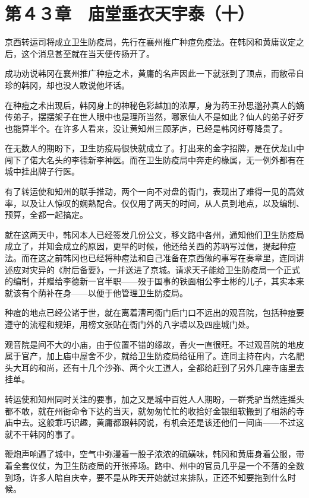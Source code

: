 \section{第４３章　庙堂垂衣天宇泰（十）}

京西转运司将成立卫生防疫局，先行在襄州推广种痘免疫法。在韩冈和黄庸议定之后，这个消息甚至就在当天便传扬开了。

成功劝说韩冈在襄州推广种痘之术，黄庸的名声因此一下就涨到了顶点，而敝帚自珍的韩冈，却也没人敢说他坏话。

在种痘之术出现后，韩冈身上的神秘色彩越加的浓厚，身为药王孙思邈孙真人的嫡传弟子，摆摆架子在世人眼中也是理所当然，哪家仙人不是如此？仙人的弟子好歹也能算半个。在许多人看来，没让黄知州三顾茅庐，已经是韩冈纡尊降贵了。

在无数人的期盼下，卫生防疫局很快就成立了。打出来的金字招牌，是在伏龙山中闯下了偌大名头的李德新李神医。而在卫生防疫局中奔走的椽属，无一例外都有在城中挂出牌子行医。

有了转运使和知州的联手推动，两个一向不对盘的衙门，表现出了难得一见的高效率，以及让人惊叹的娴熟配合。仅仅用了两天的时间，从人员到地点，以及编制、预算，全都一起搞定。

就在这两天中，韩冈本人已经签发几份公文，移文路中各州，通知他们卫生防疫局成立了，并知会成立的原因，更早的时候，他还给关西的苏昞写过信，提起种痘法。而在这之前韩冈也已经将种痘法和自己准备在京西做的事写在奏章里，连同讲述应对灾异的《肘后备要》，一并送进了京城。请求天子能给卫生防疫局一个正式的编制，并赠给李德新一官半职——殁于国事的铁面相公李士彬的儿子，其实本来就该有个荫补在身——以便于他管理卫生防疫局。

种痘的地点已经公诸于世，就在离着漕司衙门后门口不远出的观音院，包括种痘要遵守的流程和规矩，用榜文张贴在衙门外的八字墙以及四座城门处。

观音院是间不大的小庙，由于位置不错的缘故，香火一直很旺。不过观音院的地皮属于官产，加上庙中屋舍不少，就给卫生防疫局给征用了。连同主持在内，六名肥头大耳的和尚，还有十几个沙弥、两个火工道人，全都给赶到了另外几座寺庙里去挂单。

转运使和知州同时关注的要事，加之又是城中百姓人人期盼，一群秃驴当然连摇头都不敢，就在州衙命令下达的当天，就匆匆忙忙的收拾好金银细软搬到了相熟的寺庙中去。这般乖巧识趣，黄庸都跟韩冈说，有机会还是该还他们一间庙——不过这就不干韩冈的事了。

鞭炮声响遍了城中，空气中弥漫着一股子浓浓的硫磺味，韩冈和黄庸身着公服，带着全套仪仗，为卫生防疫局的开张捧场。路中、州中的官员几乎是一个不落的全数到场，许多人暗自庆幸，要不是从昨天开始就过来排队，正还不知要拖到什么时候。

